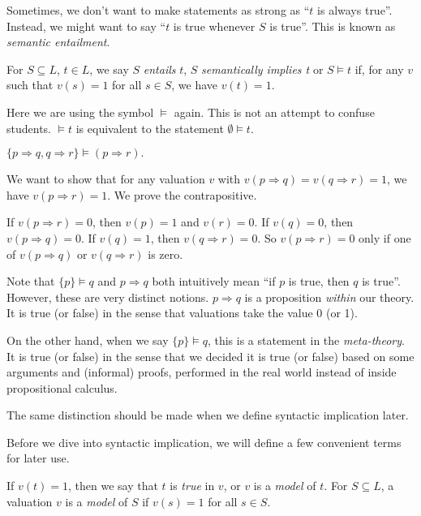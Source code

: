 \documentclass[a4paper]{article}
\begin{document}
Sometimes, we don't want to make statements as strong as ``$t$ is always true''. Instead, we might want to say ``$t$ is true whenever $S$ is true''. This is known as \emph{semantic entailment}.
\begin{defi}
  For $S\subseteq L$, $t\in L$, we say $S$ \emph{entails} $t$, $S$ \emph{semantically implies t} or $S\models t$ if, for any $v$ such that $v(s) = 1$ for all $s\in S$, we have $v(t) = 1$.
\end{defi}
Here we are using the symbol $\models$ again. This is not an attempt to confuse students. $\models t$ is equivalent to the statement $\emptyset \models t$.

\begin{eg}
  $\{p\Rightarrow q, q\Rightarrow r\}\models (p\Rightarrow r).$

  We want to show that for any valuation $v$ with $v(p\Rightarrow q) = v(q\Rightarrow r) = 1$, we have $v(p\Rightarrow r) = 1$. We prove the contrapositive.

  If $v(p\Rightarrow r) = 0$, then $v(p) = 1$ and $v(r) = 0$. If $v(q) = 0$, then $v(p\Rightarrow q) = 0$. If $v(q) = 1$, then $v(q\Rightarrow r) = 0$. So $v(p\Rightarrow r) = 0$ only if one of $v(p\Rightarrow q)$ or $v(q\Rightarrow r)$ is zero.
\end{eg}

Note that $\{p\}\models q$ and $p \Rightarrow q$ both intuitively mean ``if $p$ is true, then $q$ is true''. However, these are very distinct notions. $p\Rightarrow q$ is a proposition \emph{within} our theory. It is true (or false) in the sense that valuations take the value 0 (or 1).

On the other hand, when we say $\{p\} \models q$, this is a statement in the \emph{meta-theory}. It is true (or false) in the sense that we decided it is true (or false) based on some arguments and (informal) proofs, performed in the real world instead of inside propositional calculus.

The same distinction should be made when we define syntactic implication later.

Before we dive into syntactic implication, we will define a few convenient terms for later use.
\begin{defi}
  If $v(t) = 1$, then we say that $t$ is \emph{true} in $v$, or $v$ is a \emph{model} of $t$. For $S\subseteq L$, a valuation $v$ is a \emph{model} of $S$ if $v(s) = 1$ for all $s\in S$.
\end{defi}
\end{document}
